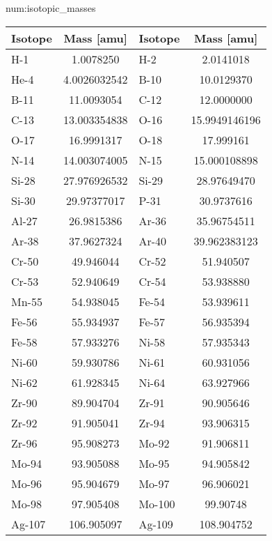 \begin{numitem}{num:isotopic_masses}
 \begin{center}
  \begin{tabular}{l c l c}
    \toprule
    Isotope & Mass [amu] & Isotope & Mass [amu] \\
    \midrule
    \midrule
 H-1   &   1.0078250    &  H-2   &   2.0141018    \\
He-4   &   4.0026032542 &  B-10  &  10.0129370    \\
 B-11  &  11.0093054    &  C-12  &  12.0000000    \\
 C-13  &  13.003354838  &  O-16  &  15.9949146196 \\
 O-17  &  16.9991317    &  O-18  &  17.999161     \\
 N-14  &  14.003074005  &  N-15  &  15.000108898  \\
Si-28  &  27.976926532  & Si-29  &  28.97649470   \\
Si-30  &  29.97377017   & P-31   &  30.9737616    \\
Al-27  &  26.9815386    & Ar-36  &  35.96754511   \\
Ar-38  &  37.9627324    & Ar-40  &  39.962383123  \\
Cr-50  &  49.946044     & Cr-52  &  51.940507     \\
Cr-53  &  52.940649     & Cr-54  &  53.938880     \\
Mn-55  &  54.938045     & Fe-54  &  53.939611     \\
Fe-56  &  55.934937     & Fe-57  &  56.935394     \\
Fe-58  &  57.933276     & Ni-58  &  57.935343     \\
Ni-60  &  59.930786     & Ni-61  &  60.931056     \\
Ni-62  &  61.928345     & Ni-64  &  63.927966     \\
Zr-90  &  89.904704     & Zr-91  &  90.905646     \\
Zr-92  &  91.905041     & Zr-94  &  93.906315     \\
Zr-96  &  95.908273     & Mo-92  &  91.906811     \\
Mo-94  &  93.905088     & Mo-95  &  94.905842     \\
Mo-96  &  95.904679     & Mo-97  &  96.906021     \\
Mo-98  &  97.905408     & Mo-100 &  99.90748      \\
Ag-107 & 106.905097     & Ag-109 & 108.904752     \\

\end{tabular}
\end{center}
\end{numitem}
